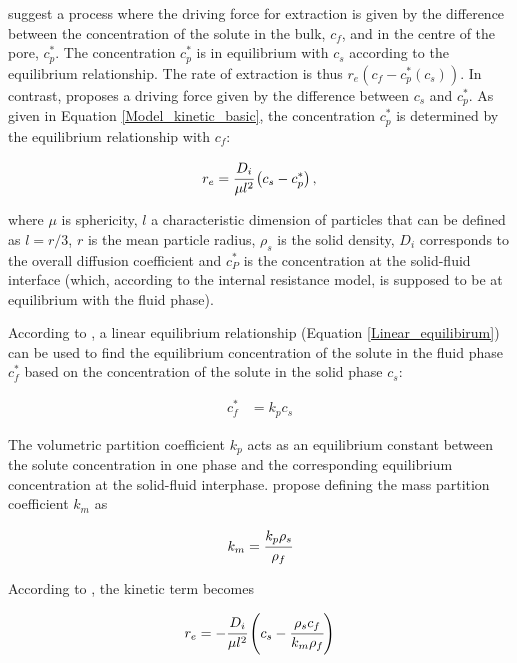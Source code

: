 \documentclass[a4paper,fleqn]{cas-dc}
\begin{document}
	\citet{Bulley1984} suggest a process where the driving force for extraction is given by the difference between the concentration of the solute in the bulk, $c_f$, and in the centre of the pore, $c_p^*$. The concentration $c_p^*$ is in equilibrium with $c_s$ according to the equilibrium relationship. The rate of extraction is thus $r_e\left(c_f - c^*_p(c_s)\right)$. In contrast, \citet{Reverchon1996} proposes a driving force given by the difference between $c_s$ and $c_p^*$. As given in Equation \ref{Model_kinetic_basic}, the concentration $c_p^*$ is determined by the equilibrium relationship with $c_f$:
	
	{\footnotesize
		\begin{equation} \label{Model_kinetic_basic}
			r_e = \cfrac{D_i}{\mu l^2 }\left(c_s - c_p^* \right),
	\end{equation} }
	
	where $\mu$ is sphericity, $l$ a characteristic dimension of particles that can be defined as $l = r/3$, $r$ is the mean particle radius, $\rho_s$ is the solid density, $D_i$ corresponds to the overall diffusion coefficient and $c_P^*$ is the concentration at the solid-fluid interface (which, according to the internal resistance model, is supposed to be at equilibrium with the fluid phase). 
	
	According to \citet{Bulley1984}, a linear equilibrium relationship (Equation \ref{Linear_equilibirum}) can be used to find the equilibrium concentration of the solute in the fluid phase $c_f^*$ based on the concentration of the solute in the solid phase $c_s$:
	
	{\footnotesize
		\begin{align} \label{Linear_equilibirum}
			c_f^* &= k_p c_s
	\end{align} }
	
	The volumetric partition coefficient $k_p$ acts as an equilibrium constant between the solute concentration in one phase and the corresponding equilibrium concentration at the solid-fluid interphase. \citet{Spiro2007} propose defining the mass partition coefficient $k_m$ as 
	
	{\footnotesize
		\begin{align}
			k_m = \cfrac{k_p \rho_s}{\rho_f}
	\end{align} }
	
	According to \citet{Reverchon1996}, the kinetic term becomes
	
	{\footnotesize
		\begin{equation}
			\label{Model_kinetic_no_sat}
			r_e = -\cfrac{D_i}{ \mu l^2 } \left(c_s - \cfrac{\rho_s c_f}{k_m \rho_f} \right)
	\end{equation} }
\end{document}
